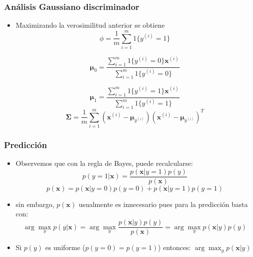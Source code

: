 \documentclass{beamer}
\begin{document}
%
\begin{frame}
\frametitle{Análisis Gaussiano discriminador}

\begin{itemize}
\item Maximizando la verosimilitud anterior se obtiene
\begin{equation*}
\phi= \frac{1}{m} \sum_{i=1}^{m} 1\lbrace y^{(i)}=1\rbrace 
\end{equation*}

\begin{equation*}
\boldsymbol{\mu}_0 = \frac{\sum_{i=1}^{m} 1\lbrace y^{(i)}=0\rbrace \boldsymbol{x}^{(i)}}{\sum_{i=1}^{m} 1\lbrace y^{(i)}=0\rbrace}
\end{equation*}

\begin{equation*}
\boldsymbol{\mu}_1 = \frac{\sum_{i=1}^{m} 1\lbrace y^{(i)}=1\rbrace \boldsymbol{x}^{(i)}}{\sum_{i=1}^{m} 1\lbrace y^{(i)}=1\rbrace}
\end{equation*}
\begin{equation*}
\boldsymbol{\Sigma}= \frac{1}{m}  \sum_{i=1}^{m}(\boldsymbol{x}^{(i)}-\boldsymbol{\mu}_{y^{(i)}} )(\boldsymbol{x}^{(i)}-\boldsymbol{\mu}_{y^{(i)}} )^T
\end{equation*}

\end{itemize}


\end{frame}
%

\begin{frame}
\frametitle{Predicción}

\begin{itemize}
\item Observemos que con la regla de Bayes, puede recalcularse:
\begin{equation*}
p(y=1\vert \boldsymbol{x})= \frac{p(\boldsymbol{x}\vert y=1)p(y)}{p(\boldsymbol{x})}
\end{equation*}   
\begin{equation*}
p(\boldsymbol{x})= p(\boldsymbol{x}\vert y=0)p(y=0)+ p(\boldsymbol{x}\vert y=1)p(y=1) 
\end{equation*}
\item sin embargo, $p(\boldsymbol{x})$ usualmente es innecesario pues para la predicción basta con:
\begin{equation*}
\arg\max_{y} p(y \vert \boldsymbol{x})=  \arg\max_{y} \frac{p(\boldsymbol{x} \vert y) p(y)}{p(\boldsymbol{x})}= \arg\max_{y} p(\boldsymbol{x} \vert y) p(y)
\end{equation*}
\item Si $p(y)$ es uniforme ($p(y=0)=p(y=1)$) entonces: $\arg\max_{y} p(\boldsymbol{x} \vert y)$
\end{itemize}
\end{frame}
\end{document}

